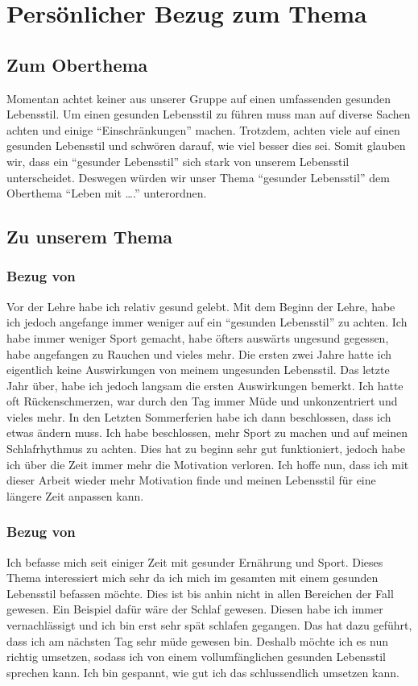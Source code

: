 \chapter{Persönlicher Bezug zum Thema}
\section{Zum Oberthema}
\chapterauthor{\dario}
Momentan achtet keiner aus unserer Gruppe auf einen umfassenden gesunden Lebensstil.
Um einen gesunden Lebensstil zu führen muss man auf diverse Sachen achten und einige “Einschränkungen” machen. Trotzdem, achten viele auf einen gesunden Lebensstil und schwören darauf, wie viel besser dies sei. 
Somit glauben wir, dass ein “gesunder Lebensstil” sich stark von unserem Lebensstil unterscheidet. Deswegen würden wir unser Thema “gesunder Lebensstil” dem Oberthema “Leben mit ….” unterordnen.
\section{Zu unserem Thema}
\subsection{Bezug von \dario}
\chapterauthor{\dario}
\label{bezug:dario}
Vor der Lehre habe ich relativ gesund gelebt. Mit dem Beginn der Lehre, habe ich jedoch angefange immer weniger auf ein “gesunden Lebensstil” zu achten.
\newline
Ich habe immer weniger Sport gemacht, habe öfters auswärts ungesund gegessen, habe angefangen zu Rauchen und vieles mehr. 
\newline
Die ersten zwei Jahre hatte ich eigentlich keine Auswirkungen von meinem ungesunden Lebensstil. 
\newline
Das letzte Jahr über, habe ich jedoch langsam die ersten Auswirkungen bemerkt. Ich hatte oft Rückenschmerzen, war durch den Tag immer Müde und unkonzentriert und vieles mehr.
\newline
In den Letzten Sommerferien habe ich dann beschlossen, dass ich etwas ändern muss. Ich habe beschlossen, mehr Sport zu machen und auf meinen Schlafrhythmus zu achten. 
\newline
Dies hat zu beginn sehr gut funktioniert, jedoch habe ich über die Zeit immer mehr die Motivation verloren.
\newline
Ich hoffe nun, dass ich mit dieser Arbeit wieder mehr Motivation finde und meinen Lebensstil für eine längere Zeit anpassen kann.
\subsection{Bezug von \bastian}
\chapterauthor{\bastian}
Ich befasse mich seit einiger Zeit mit gesunder Ernährung und Sport. Dieses Thema interessiert mich sehr da ich mich im gesamten mit einem gesunden Lebensstil befassen möchte. Dies ist bis anhin nicht in allen Bereichen der Fall gewesen. Ein Beispiel dafür wäre der Schlaf gewesen. Diesen habe ich immer vernachlässigt und ich bin erst sehr spät schlafen gegangen. Das hat dazu geführt, dass ich am nächsten Tag sehr müde gewesen bin. Deshalb möchte ich es nun richtig umsetzen, sodass ich von einem vollumfänglichen gesunden Lebensstil sprechen kann. Ich bin gespannt, wie gut ich das schlussendlich umsetzen kann.
